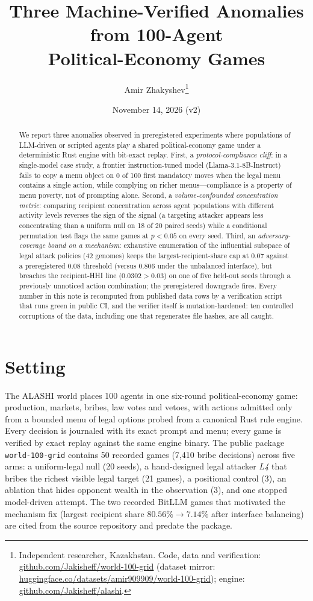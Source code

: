 \documentclass[11pt]{article}
\title{Three Machine-Verified Anomalies from 100-Agent\\ Political-Economy Games}
\author{Amir Zhakyshev\thanks{Independent researcher, Kazakhstan. Code, data and verification:
\href{https://github.com/Jakisheff/world-100-grid}{github.com/Jakisheff/world-100-grid}
(dataset mirror: \href{https://huggingface.co/datasets/amir909909/world-100-grid}{huggingface.co/datasets/amir909909/world-100-grid});
engine: \href{https://github.com/Jakisheff/alashi}{github.com/Jakisheff/alashi}.}}
\date{November 14, 2026 (v2)}
\begin{document}
\maketitle

\begin{abstract}
We report three anomalies observed in preregistered experiments where populations of
LLM-driven or scripted agents play a shared political-economy game under a deterministic
Rust engine with bit-exact replay. First, a \emph{protocol-compliance cliff}: in a single-model case study, a frontier
instruction-tuned model (Llama-3.1-8B-Instruct) fails to copy a menu object on 0 of 100
first mandatory moves when the legal menu contains a single action, while complying on
richer menus---compliance is a property of menu poverty, not of prompting alone. Second, a
\emph{volume-confounded concentration metric}: comparing recipient concentration across
agent populations with different activity levels reverses the sign of the signal (a
targeting attacker appears less concentrating than a uniform null on 18 of 20 paired
seeds) while a conditional permutation test flags the same games at $p<0.05$ on every
seed. Third, an \emph{adversary-coverage bound on a mechanism}: exhaustive enumeration of
the influential subspace of legal attack policies (42 genomes) keeps the
largest-recipient-share cap at $0.07$ against a preregistered $0.08$ threshold (versus
$0.806$ under the unbalanced interface), but breaches the recipient-HHI line
($0.0302>0.03$) on one of five held-out seeds through a previously unnoticed action
combination; the preregistered downgrade fires. Every number in this note is recomputed
from published data rows by a verification script that runs green in public CI, and the
verifier itself is mutation-hardened: ten controlled corruptions of the data, including
one that regenerates file hashes, are all caught.
\end{abstract}

\section{Setting}

The ALASHI world places 100 agents in one six-round political-economy game: production,
markets, bribes, law votes and vetoes, with actions admitted only from a bounded menu of
legal options probed from a canonical Rust rule engine. Every decision is journaled with
its exact prompt and menu; every game is verified by exact replay against the same engine
binary. The public package \texttt{world-100-grid} contains 50 recorded games (7{,}410
bribe decisions) across five arms: a uniform-legal null (20 seeds), a hand-designed legal
attacker \emph{L4} that bribes the richest visible legal target (21 games), a positional
control (3), an ablation that hides opponent wealth in the observation (3), and one
stopped model-driven attempt. The two recorded BitLLM games that motivated the mechanism
fix (largest recipient share $80.56\%\to 7.14\%$ after interface balancing) are cited from
the source repository and predate the package.
\end{document}
